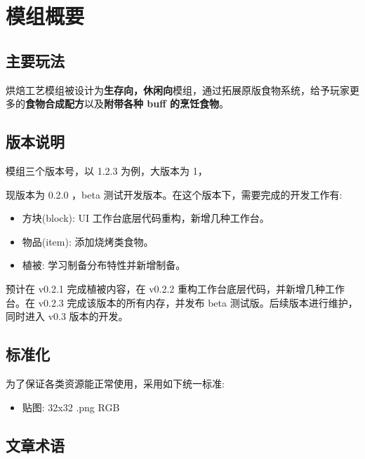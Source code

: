 \section{模组概要}
\subsection{主要玩法}

烘焙工艺模组被设计为\textbf{生存向，休闲向}模组，通过拓展原版食物系统，给予玩家更多的\textbf{食物合成配方}以及\textbf{附带各种 buff 的烹饪食物}。

\subsection{版本说明}

模组三个版本号，以 1.2.3 为例，大版本为 1，

现版本为 0.2.0 ，beta 测试开发版本。在这个版本下，需要完成的开发工作有:

\begin{itemize}
    \item 方块(block): UI 工作台底层代码重构，新增几种工作台。
    \item 物品(item): 添加烧烤类食物。
    \item 植被: 学习制备分布特性并新增制备。
\end{itemize}

预计在 v0.2.1 完成植被内容，在 v0.2.2 重构工作台底层代码，并新增几种工作台。在 v0.2.3 完成该版本的所有内存，并发布 beta 测试版。后续版本进行维护，同时进入 v0.3 版本的开发。

\subsection{标准化}

为了保证各类资源能正常使用，采用如下统一标准:
\begin{itemize}
    \item 贴图: 32x32 .png RGB
\end{itemize}

\subsection{文章术语}

